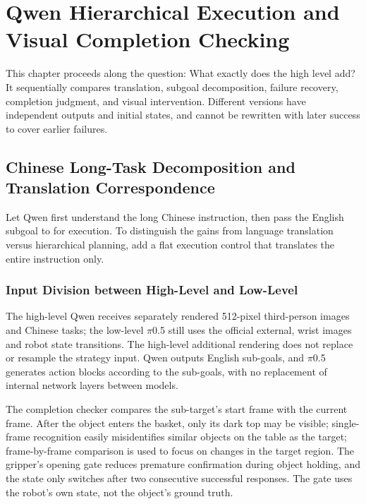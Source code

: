 \chapter{Qwen Hierarchical Execution and Visual Completion Checking}

This chapter proceeds along the question: What exactly does the high level add? It sequentially compares translation, subgoal decomposition, failure recovery, completion judgment, and visual intervention. Different versions have independent outputs and initial states, and cannot be rewritten with later success to cover earlier failures.

\section{Chinese Long-Task Decomposition and Translation Correspondence}

\label{stage:s09}

Let Qwen first understand the long Chinese instruction, then pass the English subgoal to \pifive{} for execution. To distinguish the gains from language translation versus hierarchical planning, add a flat execution control that translates the entire instruction only.

\subsection{Input Division between High-Level and Low-Level}\label{s09-detail-1}

The high-level Qwen receives separately rendered 512-pixel third-person images and Chinese tasks; the low-level \(\pi\)0.5 still uses the official external, wrist images and robot state transitions. The high-level additional rendering does not replace or resample the strategy input. Qwen outputs English sub-goals, and \(\pi\)0.5 generates action blocks according to the sub-goals, with no replacement of internal network layers between models.

The completion checker compares the sub-target's start frame with the current frame. After the object enters the basket, only its dark top may be visible; single-frame recognition easily misidentifies similar objects on the table as the target; frame-by-frame comparison is used to focus on changes in the target region. The gripper's opening gate reduces premature confirmation during object holding, and the state only switches after two consecutive successful responses. The gate uses the robot's own state, not the object's ground truth.

